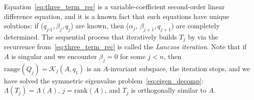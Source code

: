 \documentclass[12pt]{article}
\numberwithin{equation}{section}
\newcommand{\+}{%
	\raisebox{0.18ex}{\scaleobj{0.55}{+}}
}
\theoremstyle{definition}
\begin{document}
Equation~\eqref{eq:three_term_rec} is a variable-coefficient second-order linear difference equation, and it is a known fact that such equations have unique solutions: if ($q_{j\text{-}1}, \beta_j, q_j$) are known, then ($\alpha_j$, $\beta_{j+1}, q_{j+1}$) are completely determined. 
The sequential process that iteratively builds $T_j$ by via the recurrence from~\eqref{eq:three_term_rec} is called the \emph{Lanczos iteration}. 
Note that if $A$ is singular and we encounter $\beta_j = 0$ for some $j < n$, then $\mathrm{range}(Q_j) = \mathcal{K}_j(A, q_1)$ is an $A$-invariant subspace, the iteration stops, and we have solved the symmetric eigenvalue problem~\eqref{eq:eigen_decomp}: $\Lambda(T_j) = \Lambda(A)$, $j = \mathrm{rank}(A)$, and $T_j$ is orthogonally similar to $A$. 
\end{document}
